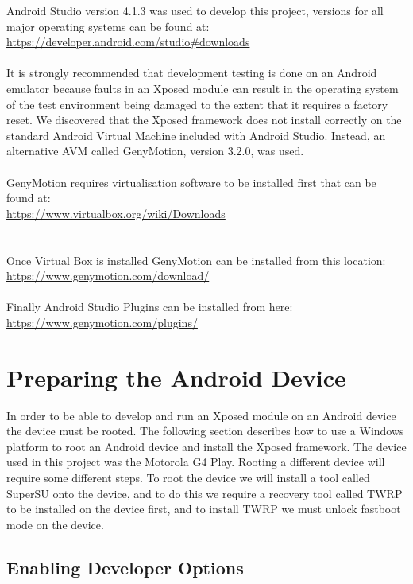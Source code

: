 Android Studio version 4.1.3 was used to develop this project, versions for all major operating systems can be found at:\\
\url{https://developer.android.com/studio#downloads}\\
\\
It is strongly recommended that development testing is done on an Android emulator because faults in an Xposed module can result in the operating system of the test environment being damaged to the extent that it requires a factory reset.  We discovered that the Xposed framework does not install correctly on the standard Android Virtual Machine included with Android Studio.  Instead, an alternative AVM called GenyMotion, version 3.2.0, was used.\\
\\
GenyMotion requires virtualisation software to be installed first that can be found at:\\
\url{https://www.virtualbox.org/wiki/Downloads}\\
\\
\\
Once Virtual Box is installed GenyMotion can be installed from this location:\\
\url{https://www.genymotion.com/download/}\\
\\
Finally Android Studio Plugins can be installed from here:\\
\url{https://www.genymotion.com/plugins/}

\section{Preparing the Android Device}
\label{sec:Preparing the Android device}

In order to be able to develop and run an Xposed module on an Android device the device must be rooted.  The following section describes how to use a Windows platform to root an Android device and install the Xposed framework.  The device used in this project was the Motorola G4 Play.  Rooting a different device will require some different steps.  To root the device we will install a tool called SuperSU onto the device, and to do this we require a recovery tool called TWRP to be installed on the device first, and to install TWRP we must unlock fastboot mode on the device.

\subsection{Enabling Developer Options}
\label{sec:Enabling developer options on the device}

